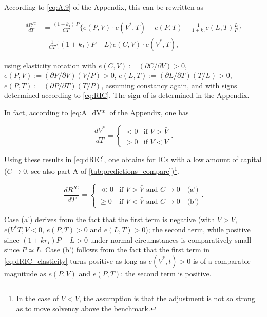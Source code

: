 According to \autoref{eq:A.9} of the Appendix, this can be rewritten as

\begin{align}
    \frac{dR^{IC}}{dT} &= 
    \frac{(1 + k_I) \, P}{CT} 
    \bigg\{ 
        e(P, V) \cdot e(V^*, T) + e(P, T) - \frac{1}{1 + k_I} e(L, T) \frac{L}{P} 
    \bigg\} \nonumber\\
    &- \frac{1}{CT} 
    \bigg\{ 
        (1 + k_I) P - L 
    \bigg\} e(C, V) \cdot e(V^*, T), \label{eq:dRIC_elasticity}
\end{align}

\noindent using elasticity notation with $e(C,V):= (\partial C/ \partial V)>0$, $e(P,V):= (\partial P / \partial V)(V/P)>0$, $e(L,T):= (\partial L / \partial T) (T/L)>0$, $e(P,T):=(\partial P/ \partial T)(T/P)$, assuming constancy again, and with signs determined according to \autoref{eq:RIC}. The sign of    is determined in the Appendix.

In fact, according to \autoref{eq:A_dV*} of the Appendix, one has

\begin{equation}
    \frac{dV^*}{dT} =
    \begin{cases} 
        < 0 & \text{if } V > \bar{V} \\ 
        > 0 & \text{if } V < \bar{V}
    \end{cases}. \label{eq:dV*}
\end{equation}

Using these results in \autoref{eq:dRIC}, one obtains for \acp{IC} with a low amount of capital ($C \rightarrow 0$, see also part A of \autoref{tab:predictions_compare})\footnote{In the case of $V<\bar{V}$, the assumption is that the adjustment is not so strong as to move solvency above the benchmark.}.

\begin{equation}
    \frac{dR^{IC}}{dT} =
    \begin{cases} 
        \ll 0 & \text{if } V > \bar{V} \text{ and } C \to 0 \quad \text{(a')} \\ 
        \geq 0 & \text{if } V < \bar{V} \text{ and } C \to 0 \quad \text{(b')}
    \end{cases}. \label{eq:dRIC_cases1}
\end{equation}


Case (a') derives from the fact that the first term is negative (with $V>\bar{V}$, $e(V^*T,\bar{V}<0$, $e(P,T)>0 $ and $e(L,T)>0$); the second term, while positive since $(1+kr_I)P-L>0$ under normal circumstances is comparatively small since $P \simeq L$. Case (b') follows from the fact that the first term in \autoref{eq:dRIC_elasticity} turns positive as long as $e(V^*,t)>0$ is of a comparable magnitude as $e(P,V)$ and $e(P,T)$; the second term is positive.

